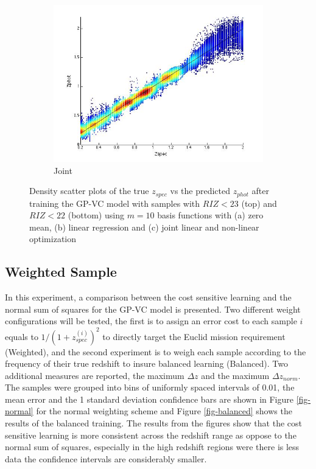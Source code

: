 \documentclass[useAMS,usenatbib,fleqn]{mn2e}
\begin{document}
\begin{figure}
\begin{subfigure}[b]{73px}
                \includegraphics[trim = 35px 15px 50px 25px, clip=true,width=\textwidth]{22_J.jpg}
                \caption{Joint}
        \end{subfigure}
        
        \caption{Density scatter plots of the true $z_{spec}$ vs the predicted $z_{phot}$ after training the GP-VC model with samples with $RIZ<23$ (top) and $RIZ<22$ (bottom) using $m=10$ basis functions with (a) zero mean, (b) linear regression and (c) joint linear and non-linear optimization}
        \label{fig-RIZ-splits}
\end{figure}


\subsection{Weighted Sample}
In this experiment, a comparison between the cost sensitive learning and the normal sum of squares for the GP-VC model is presented. Two different weight configurations will be tested, the first is to assign an error cost to each sample $i$ equals to $1/\left(1+z_{spec}^{(i)}\right)^{2}$ to directly target the Euclid mission requirement (Weighted), and the second experiment is to weigh each sample according to the frequency of their true redshift to insure balanced learning (Balanced).  Two additional measures are reported, the maximum $\Delta z$ and the maximum $\Delta z_{norm}$. The samples were grouped into bins of uniformly spaced intervals of 0.01, the mean error and the 1 standard deviation confidence bars are shown in Figure \ref{fig-normal} for the normal weighting scheme and Figure \ref{fig-balanced} shows the results of the balanced training. The results from the figures show that the cost sensitive learning is more consistent across the redshift range as oppose to the normal sum of squares, especially in the high redshift regions were there is less data the confidence intervals are considerably smaller.
\end{document}
